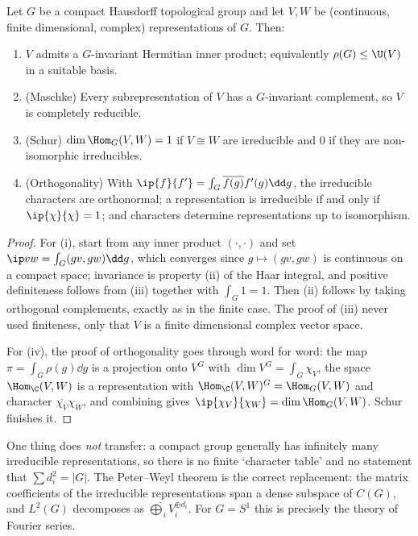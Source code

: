 \begin{theorem}
	Let $G$ be a compact Hausdorff topological group and let $V, W$ be (continuous, finite dimensional, complex) representations of $G$. Then:
	\begin{enumerate}[label=(\roman*)]
		\item $V$ admits a $G$-invariant Hermitian inner product; equivalently $\rho(G)\leq\U(V)$ in a suitable basis.
		\item (Maschke) Every subrepresentation of $V$ has a $G$-invariant complement, so $V$ is completely reducible.
		\item (Schur) $\dim\Hom_G(V,W) = 1$ if $V\cong W$ are irreducible and $0$ if they are non-isomorphic irreducibles.
		\item (Orthogonality) With $\ip{f}{f'} = \int_G\overline{f(g)}f'(g)\dd g$, the irreducible characters are orthonormal; a representation is irreducible if and only if $\ip{\chi}{\chi} = 1$; and characters determine representations up to isomorphism.
	\end{enumerate}
\end{theorem}
\begin{proof}
	For (i), start from any inner product $(\cdot,\cdot)$ and set $\ip vw = \int_G(gv,gw)\dd g$, which converges since $g\mapsto (gv,gw)$ is continuous on a compact space; invariance is property (ii) of the Haar integral, and positive definiteness follows from (iii) together with $\int_G1 = 1$. Then (ii) follows by taking orthogonal complements, exactly as in the finite case. The proof of (iii) never used finiteness, only that $V$ is a finite dimensional complex vector space.

	For (iv), the proof of orthogonality goes through word for word: the map $\pi = \int_G\rho(g)\dd g$ is a projection onto $V^G$ with $\dim V^G = \int_G\chi_V$, the space $\Hom_\C(V,W)$ is a representation with $\Hom_\C(V,W)^G = \Hom_G(V,W)$ and character $\overline{\chi_V}\chi_W$, and combining gives $\ip{\chi_V}{\chi_W} = \dim\Hom_G(V,W)$. Schur finishes it.
\end{proof}

\begin{remark}
	One thing does \emph{not} transfer: a compact group generally has infinitely many irreducible representations, so there is no finite `character table' and no statement that $\sum d_i^2 = |G|$. The Peter--Weyl theorem is the correct replacement: the matrix coefficients of the irreducible representations span a dense subspace of $C(G)$, and $L^2(G)$ decomposes as $\widehat\bigoplus_i V_i^{\oplus d_i}$. For $G = S^1$ this is precisely the theory of Fourier series.
\end{remark}


